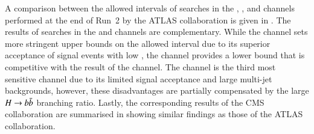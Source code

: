 A comparison between the allowed \klambda intervals of searches in the \bbbb,
\bbtautau, and \bbyy channels performed at the end of Run~2 by the ATLAS
collaboration is given in . The results of searches in
the \bbtautau and \bbyy channels are complementary. While the \bbyy channel sets
more stringent upper bounds on the allowed \klambda interval due to its superior
acceptance of signal events with low \mHH, the \bbtautau channel provides a
lower bound that is competitive with the result of the \bbyy channel. The \bbbb
channel is the third most sensitive channel due to its limited signal acceptance
and large multi-jet backgrounds, however, these disadvantages are partially
compensated by the large $H \to b\bar{b}$ branching ratio. Lastly, the
corresponding results of the CMS collaboration are summarised in
 showing similar findings as those of the ATLAS
collaboration.

